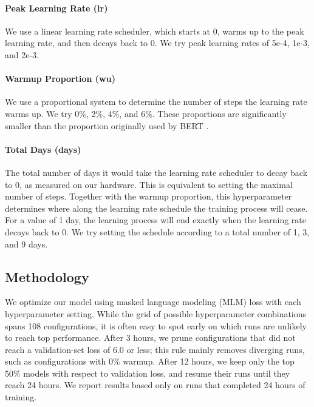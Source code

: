 \documentclass[11pt]{article}
\begin{document}
\paragraph{Peak Learning Rate (lr)}
We use a linear learning rate scheduler, which starts at 0, warms up to the peak learning rate, and then decays back to 0.
We try peak learning rates of 5e-4, 1e-3, and 2e-3.

\paragraph{Warmup Proportion (wu)}
We use a proportional system to determine the number of steps the learning rate warms up.
We try 0\%, 2\%, 4\%, and 6\%.
These proportions are significantly smaller than the proportion originally used by BERT \cite{devlin-etal-2019-bert}.

\paragraph{Total Days (days)}
The total number of days it would take the learning rate scheduler to decay back to 0, as measured on our hardware. This is equivalent to setting the maximal number of steps.
Together with the warmup proportion, this hyperparameter determines where along the learning rate schedule the training process will cease.
For a value of 1 day, the learning process will end exactly when the learning rate decays back to 0.
We try setting the schedule according to a total number of 1, 3, and 9 days.


\subsection{Methodology}

We optimize our model using masked language modeling (MLM) loss with each hyperparameter setting.
While the grid of possible hyperparameter combinations spans 108 configurations, it is often easy to spot early on which runs are unlikely to reach top performance.
After 3 hours, we prune configurations that did not reach a validation-set loss of 6.0 or less; this rule mainly removes diverging runs, such as configurations with 0\% warmup.
After 12 hours, we keep only the top 50\% models with respect to validation loss, and resume their runs until they reach 24 hours.
We report results based only on runs that completed 24 hours of training.
\end{document}

